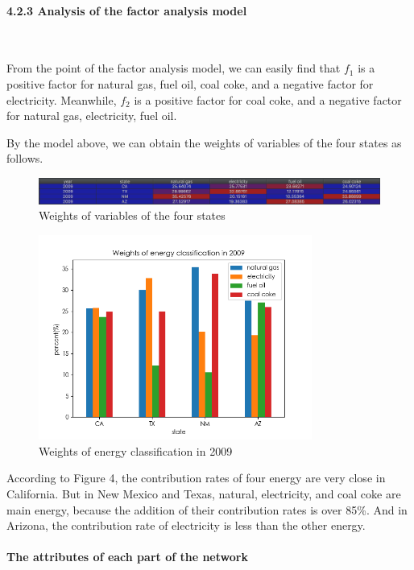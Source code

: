 \documentclass[a4paper,11pt]{article}
\begin{document}
\paragraph{4.2.3 Analysis of the factor analysis model}

\textrm{\\}
\par From the point of the factor analysis model, we can easily find that $f_1$ is a positive factor for natural gas, fuel oil, coal coke, and a negative factor for electricity. Meanwhile, $f_2$ is a positive factor for coal coke, and a negative factor for natural gas, electricity, fuel oil. 
\par By the model above, we can obtain the weights of variables of the four states as follows.
\begin{figure}[!hptb] 
    \centering 
    \includegraphics[width=1.0\textwidth]{weights.jpg}
    \caption{Weights of variables of the four states}
\end{figure}
\begin{figure}[!hptb] 
    \centering 
    \includegraphics[width=0.8\textwidth]{1-1.png}
    \caption{Weights of energy classification in 2009}
\end{figure}
According to Figure 4, the contribution rates of four energy are very close in California. But in New Mexico and Texas, natural, electricity, and coal coke are main energy, because the addition of their contribution rates is over 85\%. And in Arizona, the contribution rate of electricity is less than the other energy. 

\paragraph{The attributes of each part of the network}
\textrm{\\}
\end{document}
